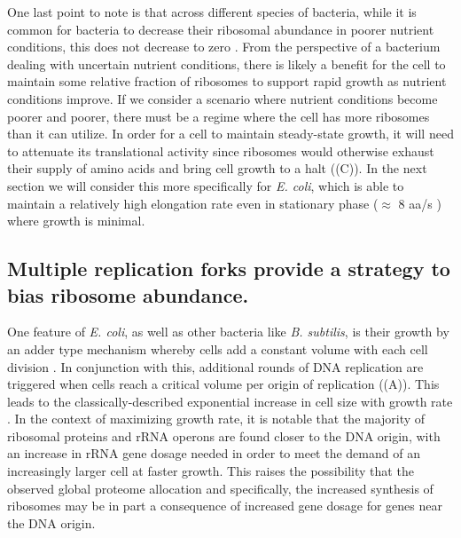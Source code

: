 One last point to note is that across different species of bacteria, while it is
common for bacteria to decrease their ribosomal abundance in poorer nutrient
conditions, this does not decrease to zero \cite{scott2010, liebermeister2014}.
From the perspective of a bacterium dealing with uncertain nutrient conditions,
there is likely a benefit for the cell to maintain some relative fraction of
ribosomes to support rapid growth as nutrient conditions improve. If we consider
a scenario where nutrient conditions become poorer and poorer, there must be a
regime where the cell has more ribosomes than it can utilize. In order for a
cell to maintain steady-state growth, it will need to attenuate its
translational activity since ribosomes would otherwise exhaust their supply of
amino acids and bring cell growth to a halt ((C)). In the next section
we will
consider this more specifically for \textit{E. coli}, which is able to maintain a
relatively high elongation rate even in stationary phase ($\approx$ 8 aa/s \cite{dai2016}) where
growth is minimal.


\subsection{Multiple replication forks provide a strategy to bias ribosome abundance.}

One feature of \textit{E. coli}, as well as other bacteria like \textit{B.
subtilis}, is their growth by an adder type mechanism whereby cells add a
constant volume with each cell division \citep{taheriaraghi2015}. In conjunction
with this, additional rounds of DNA replication are triggered when cells reach a
critical volume per origin of replication ((A)). This
leads to the classically-described exponential increase in cell size with growth
rate \cite{schaechter1958, si2017, si2019}. In the context of maximizing growth
rate, it is notable that the majority of ribosomal proteins and rRNA operons are
found closer to the DNA origin, with an increase in rRNA gene dosage needed in
order to meet the demand of an increasingly larger cell at faster growth. This
raises the possibility that the observed global proteome allocation and
specifically, the increased synthesis of ribosomes may be in part a
consequence of increased gene dosage for genes near the DNA origin.

